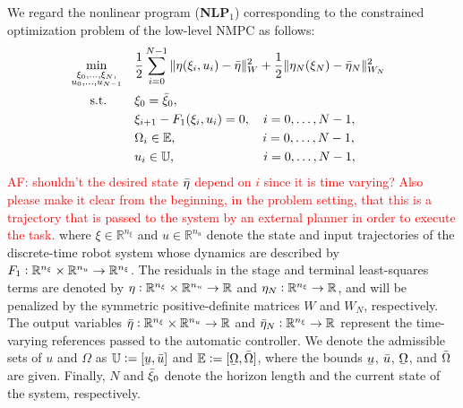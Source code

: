 We regard the nonlinear program (\textbf{NLP$_1$}) corresponding to the constrained optimization problem of the low-level NMPC as follows:
\begin{equation*}\label{eq:nlp1}
{\!\!\!\!\!}{\!\!}\begin{aligned}
&\underset{\begin{subarray}{c}
\xi_0, \dots, \xi_N, \\
u_0, \dots, u_{N-1}
\end{subarray}}{\min}	    &&\frac{1}{2}\sum_{i=0}^{N-1} \|\eta(\xi_i, u_i)-\Bar{\eta}\|^2_{W} + \frac{1}{2}\|\eta_N(\xi_N)- \Bar{\eta}_N\|^2_{W_N}\\ 
&\,\,\,\quad \text{s.t.}    &&\xi_0 = \Bar{\xi}_0, \\
& 						    &&\xi_{i+1} - F_1(\xi_i,u_i) = 0, \,\,\,\,\,\, i = 0,\dots, N-1,\\
& 						    &&\Omega_i\in \mathbb{E}, \,\,\,\,\,\,\,\,\,\,\,\,\,\,\,\,\,\,\,\,\,\,\,\,\,\,\,\,\,\,\,\,\,\,\,\,\,\,\,\,\, i = 0,\dots, N-1,\\
& 						    &&u_i\in \mathbb{U}, \,\,\,\,\,\,\,\,\,\,\,\,\,\,\,\,\,\,\,\,\,\,\,\,\,\,\,\,\,\,\,\,\,\,\,\,\,\,\,\,\,\, i = 0,\dots, N-1,
\end{aligned}{\!\!\!}
\end{equation*}
\textcolor{red}{AF: shouldn't the desired state $\Bar{\eta}$ depend on $i$ since it is time varying? Also please make it clear from the beginning, in the problem setting, that this is a trajectory that is passed to the system by an external planner in order to execute the task.}
where $\xi \in \mathbb{R}^{n_{\xi}}$ and $u \in \mathbb{R}^{n_u}$ denote the state and input trajectories of the discrete-time robot system whose dynamics are described by $F_1 \vcentcolon \mathbb{R}^{n_{\xi}} \times \mathbb{R}^{n_u} \rightarrow \mathbb{R}^{n_{\xi}}$. The residuals in the stage and terminal least-squares terms are denoted by $\eta \vcentcolon \mathbb{R}^{n_{\xi}} \times \mathbb{R}^{n_u} \rightarrow \mathbb{R}$ and $\eta_N \vcentcolon \mathbb{R}^{n_{\xi}} \rightarrow \mathbb{R}$, and will be penalized by the symmetric positive-definite matrices $W$ and $W_N$, respectively. The output variables $\Bar{\eta} \vcentcolon \mathbb{R}^{n_{\xi}} \times \mathbb{R}^{n_u} \rightarrow \mathbb{R}$ and $\Bar{\eta}_N \vcentcolon \mathbb{R}^{n_{\xi}} \rightarrow \mathbb{R}$ represent the time-varying references passed to the automatic controller. We denote the admissible sets of $u$ and $\Omega$ as $\mathbb{U} \vcentcolon = [\ubar{u}, \Bar{u}]$ and $\mathbb{E} \vcentcolon = [\ubar{\Omega}, \Bar{\Omega}]$, where the bounds $\ubar{u}$, $\Bar{u}$, $\ubar{\Omega}$, and $\Bar{\Omega}$ are given. Finally, $N$ and $\Bar{\xi}_0$ denote the horizon length and the current state of the system, respectively. 


